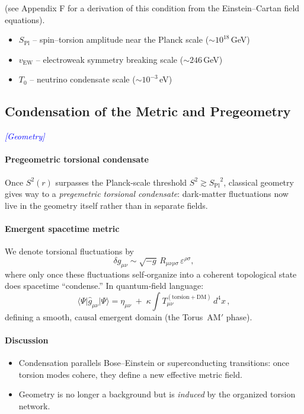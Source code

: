 \documentclass{article}
\newcommand{\Splanck}{\ensuremath{S_{\mathrm{Pl}}}}
\newcommand{\TorsionProfile}{S^2(r)}
\newcommand{\geometrytag}{\textcolor{blue}{\textit{[Geometry]}}}
\begin{document}
(see Appendix F for a derivation of this condition from the Einstein–Cartan field equations).

\begin{itemize}
  \item $S_{\text{Pl}}$ – spin–torsion amplitude near the Planck scale ($\sim 10^{18}$ GeV)
  \item $v_{\text{EW}}$ – electroweak symmetry breaking scale ($\sim 246$ GeV)
  \item $T_0$ – neutrino condensate scale ($\sim 10^{-3}$ eV)
\end{itemize}




\subsection{Condensation of the Metric and Pregeometry}
\label{sec:condensation}
\geometrytag

\paragraph{Pregeometric torsional condensate}
Once $\TorsionProfile$ surpasses the Planck‐scale threshold $S^2 \gtrsim \Splanck^2$, classical geometry gives way to a \emph{pregemetric torsional condensate}: dark‐matter fluctuations now live in the geometry itself rather than in separate fields.  

\paragraph{Emergent spacetime metric}
We denote torsional fluctuations by
\begin{equation}\label{eq:auto45}
\delta g_{\mu\nu}\sim\sqrt{-g}\,R_{\mu\nu\rho\sigma}\,\varepsilon^{\rho\sigma},
\end{equation}
where only once these fluctuations self‐organize into a coherent topological state does spacetime “condense.”  In quantum‐field language:
\begin{equation}\label{eq:auto46}
\bigl\langle\Psi\big|\hat g_{\mu\nu}\big|\Psi\bigr\rangle
   = \eta_{\mu\nu}
   \;+\;
   \kappa\int T^{(\mathrm{torsion+DM})}_{\mu\nu}\,d^4x\,,
\end{equation}
defining a smooth, causal emergent domain (the Torus~AM$'$ phase).

\paragraph{Discussion}
\begin{itemize}
  \item Condensation parallels Bose–Einstein or superconducting transitions: once torsion modes cohere, they define a new effective metric field.
  \item Geometry is no longer a background but is \emph{induced} by the organized torsion network.
\end{itemize}
\end{document}
